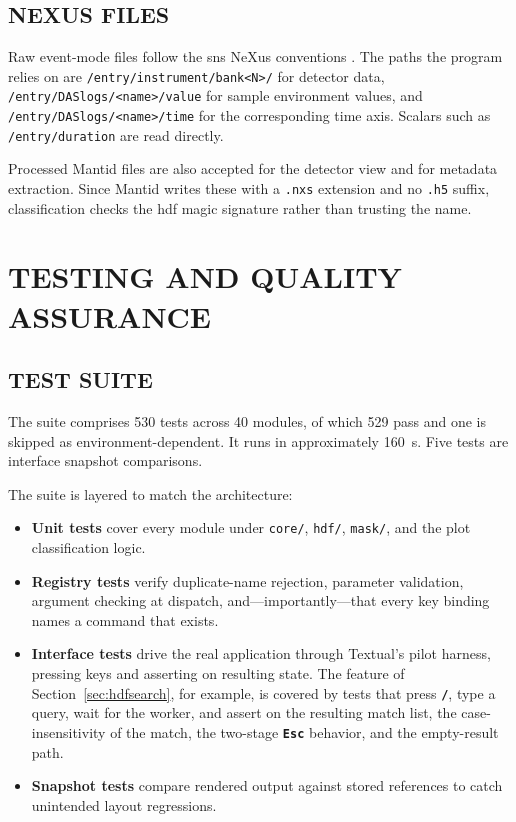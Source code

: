 \documentclass[tm]{ornltm}
\newcommand{\key}[1]{\textbf{\texttt{#1}}}
\begin{document}
\subsection{NEXUS FILES}

Raw event-mode files follow the \ac{sns} NeXus conventions
\autocite{nexus}. The paths the program relies on are
\texttt{/entry/instrument/bank<N>/} for detector data,
\texttt{/entry/DASlogs/<name>/value} for sample environment values, and
\texttt{/entry/DASlogs/<name>/time} for the corresponding time axis. Scalars such
as \texttt{/entry/duration} are read directly.

Processed Mantid files are also accepted for the detector view and for metadata
extraction. Since Mantid writes these with a \texttt{.nxs} extension and no
\texttt{.h5} suffix, classification checks the \ac{hdf} magic signature rather
than trusting the name.

\section{TESTING AND QUALITY ASSURANCE}
\label{sec:test}

\subsection{TEST SUITE}

The suite comprises 530 tests across 40 modules, of which 529 pass and one is
skipped as environment-dependent. It runs in approximately 160~s. Five tests are
interface snapshot comparisons.

The suite is layered to match the architecture:

\begin{itemize}
  \item \textbf{Unit tests} cover every module under \texttt{core/},
    \texttt{hdf/}, \texttt{mask/}, and the plot classification logic.
  \item \textbf{Registry tests} verify duplicate-name rejection, parameter
    validation, argument checking at dispatch, and---importantly---that every key
    binding names a command that exists.
  \item \textbf{Interface tests} drive the real application through Textual's
    pilot harness, pressing keys and asserting on resulting state. The feature of
    Section~\ref{sec:hdfsearch}, for example, is covered by tests that press
    \key{/}, type a query, wait for the worker, and assert on the resulting
    match list, the case-insensitivity of the match, the two-stage \key{Esc}
    behavior, and the empty-result path.
  \item \textbf{Snapshot tests} compare rendered output against stored
    references to catch unintended layout regressions.
\end{itemize}
\end{document}
